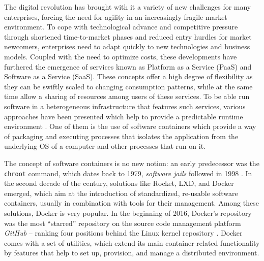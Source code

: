 
The digital revolution has brought with it a variety of new challenges for many enterprises, forcing the need for agility in an increasingly fragile market environment.
To cope with technological advance and competitive pressure through shortened time-to-market phases and reduced entry hurdles for market newcomers, enterprises need to adapt quickly to new technologies and business models.
Coupled with the need to optimize costs, these developments have furthered the emergence of services known as Platform as a Service (PaaS) and Software as a Service (SaaS)\cite[p.~606]{Buyya2009Cloud}.
These concepts offer a high degree of flexibility as they can be swiftly scaled to changing consumption patterns, while at the same time allow a sharing of resources among users of these services.
To be able run software in a heterogeneous infrastructure that features such services, various approaches have been presented which help to provide a predictable runtime environment \cite[p.~81]{Bernstein2014Containers}. One of them is the use of software containers which provide a way of packaging and executing processes that isolates the application from the underlying \ac{OS} of a computer and other processes that run on it.

The concept of software containers is no new notion: an early predecessor was the \texttt{chroot} command, which dates back to 1979, \emph{software jails} followed in 1998 \cite[p.~82]{Bernstein2014Containers}.
In the second decade of the  century, solutions like Rocket, LXD, and Docker emerged, which aim at the introduction of standardized, re-usable software containers, usually in combination with tools for their management. Among these solutions, Docker is very popular. In the beginning of 2016, Docker's repository was the  most ``starred'' repository on the source code management platform \emph{GitHub} -- ranking four positions behind the Linux kernel repository \cite{Github2016Repositories}. Docker comes with a set of utilities, which extend its main container-related functionality by features that help to set up, provision, and manage a distributed environment.


